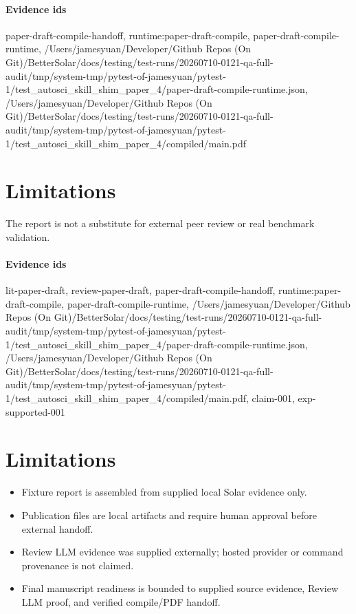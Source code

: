 \documentclass{article}
\begin{document}
\paragraph{Evidence ids} paper-draft-compile-handoff, runtime:paper-draft-compile, paper-draft-compile-runtime, /Users/jamesyuan/Developer/Github Repos (On Git)/BetterSolar/docs/testing/test-runs/20260710-0121-qa-full-audit/tmp/system-tmp/pytest-of-jamesyuan/pytest-1/test\_autosci\_skill\_shim\_paper\_4/paper-draft-compile-runtime.json, /Users/jamesyuan/Developer/Github Repos (On Git)/BetterSolar/docs/testing/test-runs/20260710-0121-qa-full-audit/tmp/system-tmp/pytest-of-jamesyuan/pytest-1/test\_autosci\_skill\_shim\_paper\_4/compiled/main.pdf

\section{Limitations}
The report is not a substitute for external peer review or real benchmark validation.

\paragraph{Evidence ids} lit-paper-draft, review-paper-draft, paper-draft-compile-handoff, runtime:paper-draft-compile, paper-draft-compile-runtime, /Users/jamesyuan/Developer/Github Repos (On Git)/BetterSolar/docs/testing/test-runs/20260710-0121-qa-full-audit/tmp/system-tmp/pytest-of-jamesyuan/pytest-1/test\_autosci\_skill\_shim\_paper\_4/paper-draft-compile-runtime.json, /Users/jamesyuan/Developer/Github Repos (On Git)/BetterSolar/docs/testing/test-runs/20260710-0121-qa-full-audit/tmp/system-tmp/pytest-of-jamesyuan/pytest-1/test\_autosci\_skill\_shim\_paper\_4/compiled/main.pdf, claim-001, exp-supported-001

\section{Limitations}

\begin{itemize}\item Fixture report is assembled from supplied local Solar evidence only.\end{itemize}
\begin{itemize}\item Publication files are local artifacts and require human approval before external handoff.\end{itemize}
\begin{itemize}\item Review LLM evidence was supplied externally; hosted provider or command provenance is not claimed.\end{itemize}
\begin{itemize}\item Final manuscript readiness is bounded to supplied source evidence, Review LLM proof, and verified compile/PDF handoff.\end{itemize}
\end{document}
